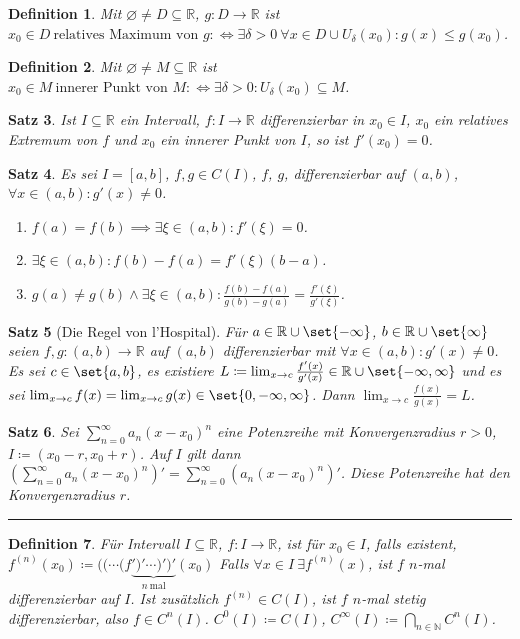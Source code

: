 \documentclass[a4paper]{article}
\newcounter{Sec}
\theoremstyle{marginbreak}
\newtheorem{definition}{Definition}[Sec]
\newtheorem{satz}[definition]{Satz}
\newcommand{\sep}{%
	\rule{\textwidth}{0.3pt}%
	\stepcounter{Sec}%
	}
\newcommand{\defiff}{:\Longleftrightarrow}
\newcommand{\series}[1][1]{\sum_{n=#1}^\infty}
\newcommand{\ps}[1][a]{\series[0]#1_n(x-x_0)^n}
\begin{document}
	\begin{definition}
		Mit $\varnothing\neq D\subseteq\mathbb{R}$, $g\colon D\to\mathbb{R}$
		ist $x_0\in D~\text{relatives Maximum von $g$}\defiff\exists\delta>0~\forall
		x\in D\cup U_\delta(x_0):g(x)\leq g(x_0)$.
	\end{definition}
	\begin{definition}
		Mit $\varnothing\neq M\subseteq\mathbb{R}$ ist
		$x_0\in M~\text{innerer Punkt von $M$}\defiff\exists\delta>0:U_\delta(x_0)\subseteq M$.
	\end{definition}
	\begin{satz}
		Ist $I\subseteq\mathbb{R}$ ein Intervall, $f\colon I\to\mathbb{R}$ differenzierbar
		in $x_0\in I$, $x_0$ ein relatives Extremum von $f$ und $x_0$ ein innerer
		Punkt von $I$, so ist $f'(x_0)=0$.
	\end{satz}
	\begin{satz}
		Es sei $I=[a,b]$, $f, g\in C(I)$, $f$, $g$, differenzierbar auf $(a,b)$,
		$\forall x\in(a,b): g'(x)\neq0$.
		\begin{enumerate}[label=(\alph*)]
			\item $f(a)=f(b)\implies\exists\xi\in(a,b):f'(\xi)=0$.
			\item $\exists\xi\in(a,b):f(b)-f(a)=f'(\xi)(b-a)$.
			\item $g(a)\neq g(b)\wedge\exists\xi\in(a,b):\frac{f(b)-f(a)}{g(b)-g(a)}=\frac{f'(\xi)}{g'(\xi)}$.
		\end{enumerate}
	\end{satz}
	\begin{satz}[Die Regel von l'Hospital]
		Für $a\in\mathbb{R}\cup\set{-\infty}$, $b\in\mathbb{R}\cup\set{\infty}$
		seien $f,g\colon (a,b)\to\mathbb{R}$ auf $(a,b)$ differenzierbar mit
		$\forall x\in(a,b):g'(x)\neq0$. Es sei $c\in\set{a, b}$, es existiere
		$L\coloneqq\lim_{x\to c}\frac{f'(x)}{g'(x)}\in\mathbb{R}\cup\set{-\infty, \infty}$
		und es sei $\lim_{x\to c}f(x)=\lim_{x\to c}g(x)\in\set{0,-\infty,\infty}$.
		Dann $\lim_{x\to c}\frac{f(x)}{g(x)}=L$.
	\end{satz}
	\begin{satz}
		Sei $\ps$ eine Potenzreihe mit Konvergenzradius $r>0$, $I\coloneqq(x_0-r,x_0+r)$.
		Auf $I$ gilt dann $(\ps)'=\sum_{n=0}^\infty(a_n(x-x_0)^n)'$. Diese Potenzreihe
		hat den Konvergenzradius $r$.
	\end{satz}
	\sep
	\begin{definition}
		Für Intervall $I\subseteq\mathbb{R}$, $f\colon I\to\mathbb{R}$, ist für $x_0\in I$,
		falls existent, $f^{(n)}(x_0) \coloneqq ((\cdots(f\underbrace{')'\cdots)')'}_{n~\text{mal}}(x_0)$
		Falls $\forall x\in I~\exists f^{(n)}(x)$, ist $f$ $n$-mal differenzierbar auf $I$.
		Ist zusätzlich $f^{(n)}\in C(I)$, ist $f$ $n$-mal stetig differenzierbar, also
		$f\in C^n(I)$. $C^0(I)\coloneqq C(I)$, $C^\infty(I)\coloneqq\bigcap_{n\in\mathbb{N}}C^n(I)$.
	\end{definition}
\end{document}
